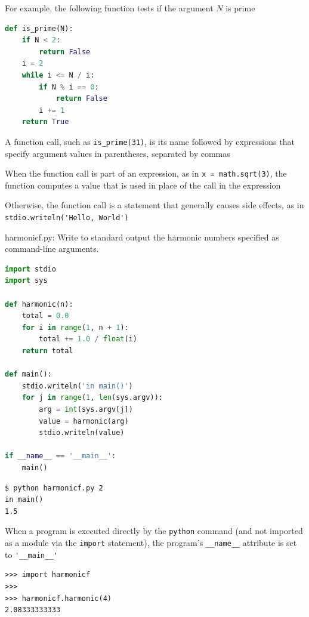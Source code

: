 \documentclass[8pt,a4paper,compress]{beamer}
\begin{document}
\begin{frame}[fragile]
\pause

For example, the following function tests if the argument $N$ is prime

\begin{lstlisting}[language=Python]
def is_prime(N):
    if N < 2: 
        return False
    i = 2
    while i <= N / i:
        if N % i == 0:
            return False
        i += 1
    return True
\end{lstlisting}

\pause
\bigskip

A function call, such as \lstinline{is_prime(31)}, is its name followed by expressions that specify argument values in parentheses, separated by commas

\pause
\bigskip

When the function call is part of an expression, as in \lstinline{x = math.sqrt(3)}, the function computes a value that is used in place of the call in the expression

\pause
\bigskip

Otherwise, the function call is a statement that generally causes side effects, as in \lstinline{stdio.writeln('Hello, World')}
\end{frame}

\begin{frame}[fragile]
\pause

\begin{framed}
\tiny harmonicf.py:  Write to standard output the harmonic numbers specified as command-line arguments.
\end{framed}

\begin{lstlisting}[language=Python]
import stdio
import sys

def harmonic(n):
    total = 0.0
    for i in range(1, n + 1):
        total += 1.0 / float(i)
    return total

def main():
    stdio.writeln('in main()')
    for j in range(1, len(sys.argv)):
        arg = int(sys.argv[j])
        value = harmonic(arg)
        stdio.writeln(value)

if __name__ == '__main__':
    main()
\end{lstlisting}

\pause

\begin{lstlisting}[language={}]
$ python harmonicf.py 2
in main()
1.5
\end{lstlisting}

\pause
\bigskip

When a program is executed directly by the \lstinline{python} command (and not imported as a module via the \lstinline{import} statement), the program's \lstinline{__name__} attribute is set to \lstinline{'__main__'}

\begin{lstlisting}[language={}]
>>> import harmonicf
>>> 
>>> harmonicf.harmonic(4)
2.08333333333
\end{lstlisting}
\end{frame}
\end{document}

